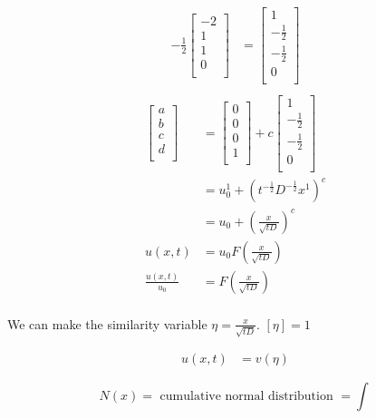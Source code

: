 \documentclass[
	date={September 4{,} 2024}
]{math486notes}
\begin{document}
\begin{equation*}
\begin{aligned}
	-\frac{1}{2}\left[ \begin{array}{c}
		-2\\
		1\\
		1\\
		0\\
	\end{array} \right]
	&= \left[ \begin{array}{c}
		1\\
		-\frac{1}{2}\\
		-\frac{1}{2}\\
		0\\
	\end{array} \right]\\
\end{aligned}
\end{equation*}
\begin{equation*}
\begin{aligned}
	\left[ \begin{array}{c}
		a\\
		b\\
		c\\
		d\\
	\end{array} \right]
	&= \left[ \begin{array}{c}
		0\\
		0\\
		0\\
		1\\
	\end{array} \right]
	+ c\left[ \begin{array}{c}
		1\\
		-\frac{1}{2}\\
		-\frac{1}{2}\\
		0\\
	\end{array} \right]\\
	&= u_{0}^{1} + \left( t^{-\frac{1}{2}}D^{-\frac{1}{2}}x^{1} \right)^{c}\\
	&= u_{0} + \left( \frac{x}{\sqrt{tD}} \right)^{c}\\
	u(x,t) &= u_{0}F\left( \frac{x}{\sqrt{tD}} \right)\\
	\frac{u(x,t)}{u_{0}} &= F\left( \frac{x}{\sqrt{tD}} \right)\\
\end{aligned}
\end{equation*}

We can make the similarity variable $\eta = \frac{x}{\sqrt{tD}}$.
$[\eta]=1$

\begin{equation*}
\begin{aligned}
	u(x,t) &= v(\eta)
\end{aligned}
\end{equation*}


\begin{equation}
	N(x) = \mbox{ cumulative normal distribution } = \int_{}^{}
	\label{eq:cumulative-normal-distribution}
\end{equation}
\end{document}
